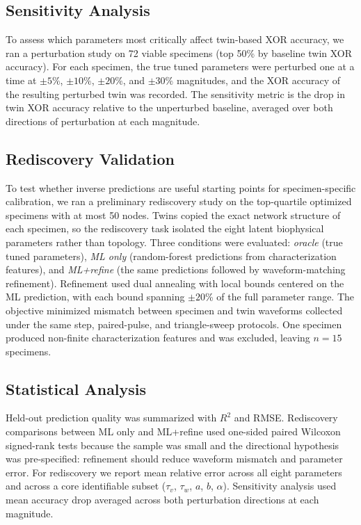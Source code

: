 \documentclass[letterpaper]{article}
\begin{document}
\subsection{Sensitivity Analysis}
To assess which parameters most critically affect twin-based XOR accuracy, we ran a perturbation study on 72 viable specimens (top 50\% by baseline twin XOR accuracy). For each specimen, the true tuned parameters were perturbed one at a time at $\pm5\%$, $\pm10\%$, $\pm20\%$, and $\pm30\%$ magnitudes, and the XOR accuracy of the resulting perturbed twin was recorded. The sensitivity metric is the drop in twin XOR accuracy relative to the unperturbed baseline, averaged over both directions of perturbation at each magnitude.

\subsection{Rediscovery Validation}
To test whether inverse predictions are useful starting points for specimen-specific calibration, we ran a preliminary rediscovery study on the top-quartile optimized specimens with at most 50 nodes. Twins copied the exact network structure of each specimen, so the rediscovery task isolated the eight latent biophysical parameters rather than topology. Three conditions were evaluated: \emph{oracle} (true tuned parameters), \emph{ML only} (random-forest predictions from characterization features), and \emph{ML+refine} (the same predictions followed by waveform-matching refinement). Refinement used dual annealing with local bounds centered on the ML prediction, with each bound spanning $\pm 20$\% of the full parameter range. The objective minimized mismatch between specimen and twin waveforms collected under the same step, paired-pulse, and triangle-sweep protocols. One specimen produced non-finite characterization features and was excluded, leaving $n=15$ specimens.

\subsection{Statistical Analysis}
Held-out prediction quality was summarized with $R^2$ and RMSE. Rediscovery comparisons between ML only and ML+refine used one-sided paired Wilcoxon signed-rank tests because the sample was small and the directional hypothesis was pre-specified: refinement should reduce waveform mismatch and parameter error. For rediscovery we report mean relative error across all eight parameters and across a core identifiable subset ($\tau_v$, $\tau_w$, $a$, $b$, $\alpha$). Sensitivity analysis used mean accuracy drop averaged across both perturbation directions at each magnitude.
\end{document}

